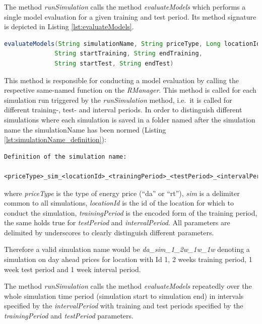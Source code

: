 The method \textit{runSimulation} calls the method \textit{evaluateModels} which performs a single model evaluation for a given training and test period. Its method signature is depicted in Listing \ref{lst:evaluateModels}. 

\begin{minipage}{\linewidth}
\begin{lstlisting}[language=Java, caption=Method evaluateModels, label={lst:evaluateModels}]
evaluateModels(String simulationName, String priceType, Long locationId, 
              String startTraining, String endTraining,
              String startTest, String endTest)
\end{lstlisting}
\end{minipage}

This method is responsible for conducting a model evaluation by calling the respective same-named function on the \textit{RManager}. This method is called for each simulation run triggered by the \textit{runSimulation} method, i.e.~it is called for different training-, test- and interval periods. In order to distinguish different simulations where each simulation is saved in a folder named after the simulation name the simulationName has been normed (Listing \ref{lst:simulationName_definition}): 

\begin{minipage}{\linewidth}
\begin{lstlisting}[caption=Simulation name definition, label={lst:simulationName_definition}]
Definition of the simulation name: 
	
<priceType>_sim_<locationId>_<trainingPeriod>_<testPeriod>_<intervalPeriod>
\end{lstlisting}
\end{minipage}

where \textit{priceType} is the type of energy price (``da'' or ``rt''), \textit{sim} is a delimiter common to all simulations, \textit{locationId} is the id of the location for which to conduct the simulation, \textit{trainingPeriod} is the encoded form of the training period, the same holds true for \textit{testPeriod} and \textit{intervalPeriod}. All parameters are delimited by underscores to clearly distinguish different parameters. 

Therefore a valid simulation name would be \textit{da\_sim\_1\_2w\_1w\_1w} denoting a simulation on day ahead prices for location with Id 1, 2 weeks training period, 1 week test period and 1 week interval period. 

The method \textit{runSimulation} calls the method \textit{evaluateModels} repeatedly over the whole simulation time period (simulation start to simulation end) in intervals specified by the \textit{intervalPeriod} with training and test periods specified by the \textit{trainingPeriod} and \textit{testPeriod} parameters. 

